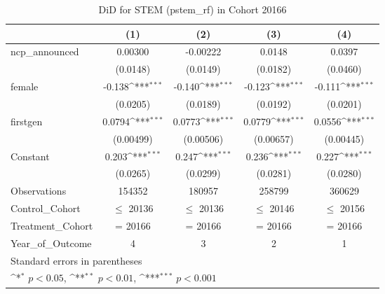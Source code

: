 \begin{table}[htbp]\centering
\def\sym#1{\ifmmode^{#1}\else\(^{#1}\)\fi}
\caption{DiD for STEM (pstem\_rf) in Cohort 20166}
\begin{tabular}{l*{4}{c}}
\toprule
                &\multicolumn{1}{c}{(1)}         &\multicolumn{1}{c}{(2)}         &\multicolumn{1}{c}{(3)}         &\multicolumn{1}{c}{(4)}         \\
\midrule
ncp\_announced   &  0.00300         & -0.00222         &   0.0148         &   0.0397         \\
                & (0.0148)         & (0.0149)         & (0.0182)         & (0.0460)         \\
\addlinespace
female          &   -0.138\sym{***}&   -0.140\sym{***}&   -0.123\sym{***}&   -0.111\sym{***}\\
                & (0.0205)         & (0.0189)         & (0.0192)         & (0.0201)         \\
\addlinespace
firstgen        &   0.0794\sym{***}&   0.0773\sym{***}&   0.0779\sym{***}&   0.0556\sym{***}\\
                &(0.00499)         &(0.00506)         &(0.00657)         &(0.00445)         \\
\addlinespace
Constant        &    0.203\sym{***}&    0.247\sym{***}&    0.236\sym{***}&    0.227\sym{***}\\
                & (0.0265)         & (0.0299)         & (0.0281)         & (0.0280)         \\
\midrule
Observations    &   154352         &   180957         &   258799         &   360629         \\
Control\_Cohort  &$\le$ 20136         &$\le$ 20136         &$\le$ 20146         &$\le$ 20156         \\
Treatment\_Cohort&  = 20166         &  = 20166         &  = 20166         &  = 20166         \\
Year\_of\_Outcome &        4         &        3         &        2         &        1         \\
\bottomrule
\multicolumn{5}{l}{\footnotesize Standard errors in parentheses}\\
\multicolumn{5}{l}{\footnotesize \sym{*} \(p<0.05\), \sym{**} \(p<0.01\), \sym{***} \(p<0.001\)}\\
\end{tabular}
\end{table}
